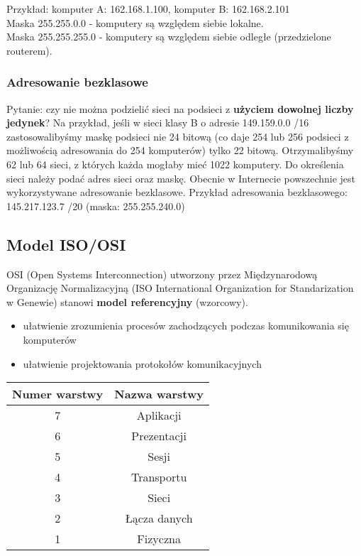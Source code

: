\documentclass[a4paper]{article}
\begin{document}
Przykład: komputer A: 162.168.1.100, komputer B: 162.168.2.101\\
Maska 255.255.0.0 - komputery są względem siebie lokalne.\\
Maska 255.255.255.0 - komputery są względem siebie odległe (przedzielone routerem).

\subsubsection{Adresowanie bezklasowe}
Pytanie: czy nie można podzielić sieci na podsieci
z \textbf{użyciem dowolnej liczby jedynek}? Na przykład, jeśli w sieci klasy B o
adresie 149.159.0.0 /16 zastosowalibyśmy maskę podsieci nie 24 bitową (co daje 254 lub
256 podsieci z możliwością adresowania do 254 komputerów) tylko 22 bitową.
Otrzymalibyśmy 62 lub 64 sieci, z których każda mogłaby mieć 1022 komputery. Do określenia sieci należy podać adres
sieci oraz maskę. Obecnie w Internecie powszechnie jest wykorzystywane adresowanie
bezklasowe.
Przykład adresowania bezklasowego: 145.217.123.7 /20 (maska: 255.255.240.0)

\subsection{Model ISO/OSI}
OSI (Open Systems Interconnection) utworzony przez Międzynarodową Organizację
Normalizacyjną (ISO International Organization for Standarization w Genewie)
stanowi \textbf{model referencyjny} (wzorcowy).

\begin{itemize}
    \item ułatwienie zrozumienia procesów zachodzących podczas komunikowania się komputerów
    \item ułatwienie projektowania protokołów komunikacyjnych
\end{itemize}

\begin{tabular}{|c|c|}
\hline
\textbf{Numer warstwy} & \textbf{Nazwa warstwy}\\
\hline
7 & Aplikacji\\
\hline
6 & Prezentacji\\
\hline
5 & Sesji\\
\hline
4 & Transportu\\
\hline
3 & Sieci\\
\hline
2 & Łącza danych\\
\hline
1 & Fizyczna\\
\hline
\end{tabular}
\end{document}
